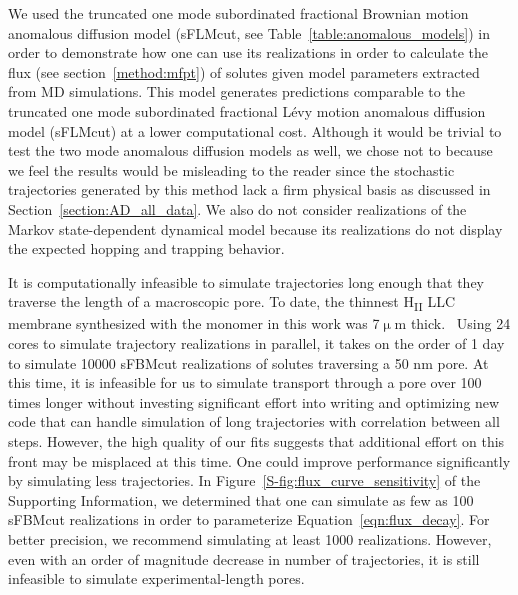 \documentclass[journal=jctcce,manuscript=article]{achemso}
\begin{document}
  We used the truncated one mode subordinated fractional Brownian motion 
  anomalous diffusion model (sFLMcut, see Table~\ref{table:anomalous_models})
  in order to demonstrate how one can use its realizations in order to
  calculate the flux (see section~\ref{method:mfpt}) of solutes given model
  parameters extracted from MD simulations. This model generates predictions 
  comparable to the truncated one mode subordinated fractional L\'evy motion
  anomalous diffusion model (sFLMcut) at a lower computational cost. 
  Although it would be trivial to test the two mode anomalous diffusion models 
  as well, we chose not to because we feel the results would be misleading to the
  reader since the stochastic trajectories generated by this method lack a firm 
  physical basis as discussed in Section~\ref{section:AD_all_data}. 
  We also do not consider realizations of the Markov state-dependent dynamical 
  model because its realizations do not display the expected hopping and 
  trapping behavior.

  It is computationally infeasible to simulate trajectories long enough that
  they traverse the length of a macroscopic pore. To date, the thinnest
  H\textsubscript{II} LLC membrane synthesized with the monomer in this work
  was 7$\upmu$m thick.~\cite{feng_thin_2016}
  Using 24 cores to simulate trajectory realizations in
  parallel, it takes on the order of 1 day to simulate 10000 sFBMcut
  realizations of solutes traversing a 50 nm pore. 
  At this time, it is infeasible for us to simulate transport through a pore over 100 times 
  longer without investing significant effort into writing and optimizing 
  new code that can handle simulation of long trajectories with correlation
  between all steps. However, the high quality of our fits suggests that 
  additional effort on this front may be misplaced at this time. 
  One could improve performance significantly by simulating less
  trajectories. In Figure~\ref{S-fig:flux_curve_sensitivity} of the Supporting
  Information, we determined that one can simulate as few as 100 sFBMcut
  realizations in order to parameterize Equation~\ref{eqn:flux_decay}. For
  better precision, we recommend simulating at least 1000 realizations.
  However, even with an order of magnitude decrease in number of trajectories,
  it is still infeasible to simulate experimental-length pores.
  
\end{document}
